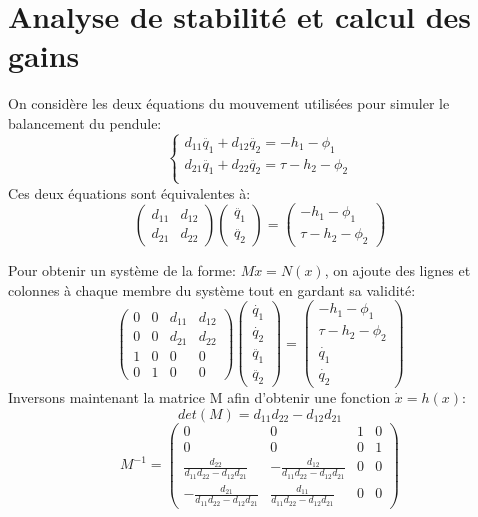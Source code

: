 \documentclass[a4paper,12pt]{report}
\begin{document}
\section*{Analyse de stabilité et calcul des gains}
On considère les deux équations du mouvement utilisées pour simuler le balancement du pendule:
$$
\left\{
    \begin{array}{ll}
        d_{11}\ddot{q_1} + d_{12}\ddot{q_2} = -h_1 - \phi_1  \\
        d_{21}\ddot{q_1} + d_{22}\ddot{q_2} = \tau -h_2 - \phi_2  \\
    \end{array}
\right.
$$
Ces deux équations sont équivalentes à:
$$
    \begin{pmatrix}
    d_{11} & d_{12} \\
    d_{21} & d_{22}
    \end{pmatrix}
    \begin{pmatrix}
    \ddot{q_1} \\
    \ddot{q_2}
    \end{pmatrix}
    =
    \begin{pmatrix}
    -h_1 - \phi_1 \\
    \tau -h_2 - \phi_2
    \end{pmatrix}
$$

Pour obtenir un système de la forme: $M\dot{x}=N(x)$, on ajoute des lignes et colonnes à chaque membre du système tout en gardant sa validité:
$$
    \begin{pmatrix}
    0 & 0 & d_{11} & d_{12} \\
    0 & 0 & d_{21} & d_{22} \\
    1 & 0 & 0 & 0 \\
    0 & 1 & 0 & 0
    \end{pmatrix}
    \begin{pmatrix}
    \dot{q_1} \\
    \dot{q_2} \\
    \ddot{q_1} \\
    \ddot{q_2}
    \end{pmatrix}
    =
    \begin{pmatrix}
    -h_1 - \phi_1 \\
    \tau -h_2 - \phi_2 \\
    \dot{q_1} \\
    \dot{q_2}
    \end{pmatrix}
$$
Inversons maintenant la matrice M afin d'obtenir une fonction $ \dot{x} = h(x) $:
$$ det(M) = d_{11}d_{22} - d_{12}d_{21} $$
$$
    M^{-1}
    =
    \begin{pmatrix}
    0 & 0 & 1 & 0 \\
    0 & 0 & 0 & 1 \\
    \frac{d_{22}}{d_{11}d_{22} - d_{12}d_{21}} & -\frac{d_{12}}{d_{11}d_{22} - d_{12}d_{21}} & 0 & 0 \\
    -\frac{d_{21}}{d_{11}d_{22} - d_{12}d_{21}} & \frac{d_{11}}{d_{11}d_{22} - d_{12}d_{21}} & 0 & 0
    \end{pmatrix}
$$
\end{document}
